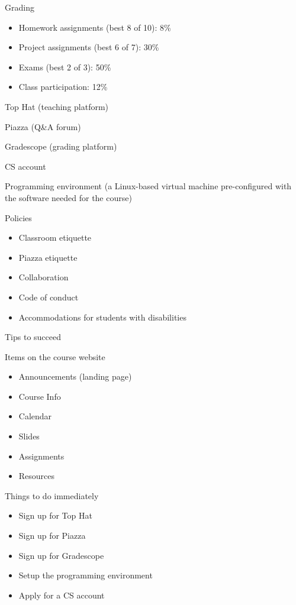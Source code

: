 \documentclass[8pt,a4paper,compress]{beamer}
\begin{document}
\begin{frame}[fragile]
\pause

Grading
\begin{itemize}
\item Homework assignments (best 8 of 10): 8\%
\item Project assignments (best 6 of 7): 30\%
\item Exams (best 2 of 3): 50\%
\item Class participation: 12\%
\end{itemize}

\pause
\bigskip

Top Hat (teaching platform)

\pause
\bigskip

Piazza (Q\&A forum)

\pause
\bigskip

Gradescope (grading platform)

\pause
\bigskip

CS account

\pause
\bigskip

Programming environment (a Linux-based virtual machine pre-configured with the software needed for the course)

\pause
\bigskip

Policies
\begin{itemize}
\item Classroom etiquette
\item Piazza etiquette
\item Collaboration
\item Code of conduct
\item Accommodations for students with disabilities
\end{itemize}
\end{frame}

\begin{frame}[fragile]
\pause

Tips to succeed

\pause
\bigskip

Items on the course website
\begin{itemize}
\item Announcements (landing page)
\item Course Info
\item Calendar
\item Slides 
\item Assignments
\item Resources
\end{itemize}

\pause
\bigskip

Things to do immediately
\begin{itemize}
\item Sign up for Top Hat
\item Sign up for Piazza
\item Sign up for Gradescope
\item Setup the programming environment
\item Apply for a CS account
\end{itemize}
\end{frame}
\end{document}
